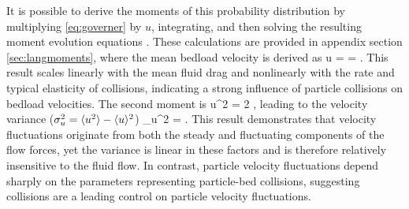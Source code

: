 It is possible to derive the moments of this probability distribution by multiplying \ref{eq:governer} by $u$, integrating, and then solving the resulting moment evolution equations \citep[c.f.][]{Cox1965}.
These calculations are provided in appendix section \ref{sec:langmoments}, where the mean bedload velocity is derived as
\be \langle u \rangle =  = . \label{eq:meanu}\ee
This result scales linearly with the mean fluid drag and nonlinearly with the rate and typical elasticity of collisions, indicating a strong influence of particle collisions on bedload velocities.
The second moment is
\be \langle u^2 \rangle = 2 , \ee
leading to the velocity variance ($\sigma_u^2 = \langle u^2 \rangle - \langle u \rangle ^2 $)
\be \sigma_u^2 = . \label{eq:varu}\ee
This result demonstrates that velocity fluctuations originate from both the steady and fluctuating components of the flow forces, yet the variance is linear in these factors and is therefore relatively insensitive to the fluid flow.
In contrast, particle velocity fluctuations depend sharply on the parameters representing particle-bed collisions, suggesting collisions are a leading control on particle velocity fluctuations.

